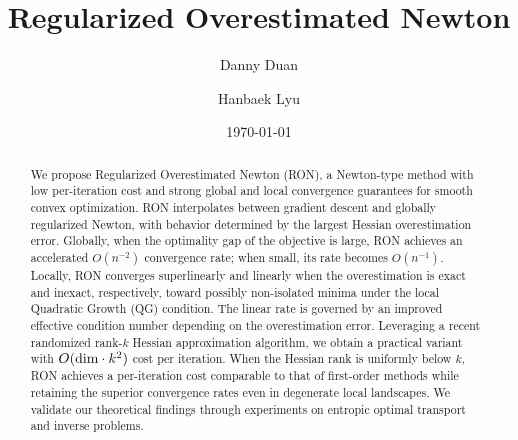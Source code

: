 \documentclass[11pt]{amsart}
\author{Danny Duan}
\author{Hanbaek Lyu}
\date{\today}
\title[Regularized Overestimated Newton]{Regularized Overestimated Newton}
\theoremstyle{plain}
\theoremstyle{definition}
\theoremstyle{remark}
\begin{document}
\begin{abstract}
We propose Regularized Overestimated Newton (RON), a Newton-type method with low per-iteration cost and strong global and local convergence guarantees for smooth convex optimization. RON interpolates between gradient descent and globally regularized Newton, with behavior determined by the largest Hessian overestimation error. Globally, when the optimality gap of the objective is large, RON achieves an accelerated  $O(n^{-2})$ convergence rate; when small, its rate becomes $O(n^{-1})$. Locally, RON converges superlinearly and linearly when the overestimation is exact and inexact, respectively, toward possibly non-isolated minima under the local Quadratic Growth (QG) condition. The linear rate is governed by an improved effective condition number depending on the overestimation error. Leveraging a recent randomized rank-$k$ Hessian approximation algorithm, we obtain a practical variant with  $O(\textup{dim}\cdot k^2)$ cost per iteration.  When the Hessian rank is uniformly below $k$, RON achieves a per-iteration cost comparable to that of first-order methods while retaining the superior convergence rates even in degenerate local landscapes. We validate our theoretical findings through experiments on entropic optimal transport and inverse problems.
\end{abstract}

\maketitle
\end{document}
